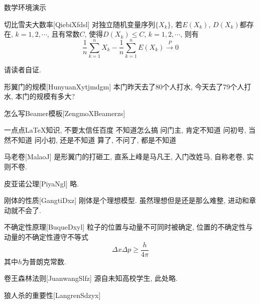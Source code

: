 \begin{frame}{数学环境演示}
	\begin{scutheorem}{切比雪夫大数率}[QiebiXfdsl]
		对独立随机变量序列$\{X_k\}$, 若$E(X_k)$, $D(X_k)$都存在, $k=1,2,\cdots$, 且有常数$C$, 使得$D(X_k)\leq C$, $k=1,2,\cdots$, 则有
		\begin{equation}
		\dfrac{1}{n} \sum_{k=1}^{n} X_k - \dfrac{1}{n} \sum_{k=1}^{n} E(X_k) \stackrel{\;P\;}{\longrightarrow} 0
		\end{equation}
	\end{scutheorem}
	\begin{scuproof}{}
		请读者自证.
	\end{scuproof}
	\begin{scuexample}{形翼门的规模}[HunyuanXytjmdgm]
		本门昨天去了80个人打水, 今天去了79个人打水, 本门的规模有多大?
	\end{scuexample}
	\begin{scualgorithm}{怎么写Beamer模板}[ZengmoXBeamerzs]
		\begin{algorithmic}[1]
		\REQUIRE 一点点\LaTeX 知识, 不要太信任百度
		\ENSURE 不知道怎么搞
		\STATE 问门主, 肯定不知道
		\STATE 问初号, 当然不知道
		\STATE 问小初, 还是不知道
		\RETURN 算了, 不问了, 都是不知道
		\end{algorithmic}
	\end{scualgorithm}
	\begin{scudefinition}{马老卷}[MalaoJ]
		是形翼门的打砸工, 直系上峰是马凡王, 入门改姓马, 自称老卷, 实则不卷.
	\end{scudefinition}
	\begin{scuaxiom}{皮亚诺公理}[PiyaNgl]
		略.
	\end{scuaxiom}
	\begin{scuproperty}{刚体的性质}[GangtiDxz]
		刚体是个理想模型. 虽然理想但是还是那么难整, 进动和章动就不会了.
	\end{scuproperty}
	\begin{scuproposition}{不确定性原理}[BuqueDxyl]
		粒子的位置与动量不可同时被确定, 位置的不确定性与动量的不确定性遵守不等式
		\begin{equation}
			\Delta x \Delta p \geq \dfrac{h}{4\pi}
		\end{equation}
		其中$h$为普朗克常数.
	\end{scuproposition}
	\begin{sculemma}{卷王森林法则}[JuanwangSlfz]
		源自未知高校学生, 此处略.
	\end{sculemma}
	\begin{scucorollary}{狼人杀的重要性}[LangrenSdzyx]

\end{scucorollary}
\end{frame}
